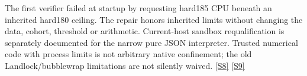 \documentclass[11pt,letterpaper]{article}
\begin{document}
The first verifier failed at startup by requesting hard185 CPU beneath an inherited hard180 ceiling. The repair honors inherited limits without changing the data, cohort, threshold or arithmetic. Current-host sandbox requalification is separately documented for the narrow pure JSON interpreter. Trusted numerical code with process limits is not arbitrary native confinement; the old Landlock/bubblewrap limitations are not silently waived. \href{https://github.com/MontrealAI/AGI-Alpha-Invention-Flywheel-Lab/blob/2b7a58e6e6593ae48da6f7f33865db94868c957f/evidence/overnight-008/xct-recovery/VERIFIER_LIMIT_REPAIR.json}{[S8]} \href{https://github.com/MontrealAI/AGI-Alpha-Invention-Flywheel-Lab/blob/2b7a58e6e6593ae48da6f7f33865db94868c957f/evidence/overnight-008/xct-recovery/sandbox-current-host-bound/artifacts/REPORT.json}{[S9]}\par
\end{document}

